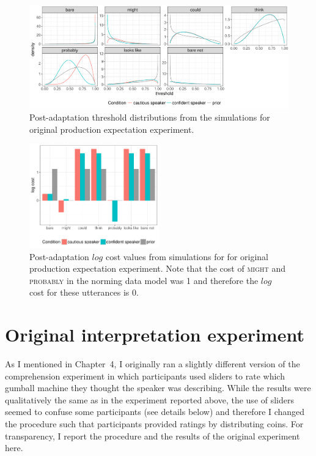 \begin{figure}[h!]
  \includegraphics[width=\textwidth]{plots/fig-F2-adaptation-posterior-thresholds.pdf}
  \caption{Post-adaptation threshold distributions from the simulations for original production expectation experiment. \label{fig:post-exposure-thresholds-original}}
\end{figure}

\begin{figure}[h!]
\center
  \includegraphics[width=0.5\textwidth]{plots/fig-F3-adaptation-posterior-costs.pdf}
  \caption{Post-adaptation $log$ cost values from simulations for for original production expectation experiment. Note that the cost of \textsc{might} and \textsc{probably} 
  in the norming data model was 1 and therefore the $log$ cost for these utterances is 0.  \label{fig:post-exposure-costs-original}}
\end{figure}




\chapter{Original interpretation experiment}

As I mentioned in Chapter~4, I originally ran a slightly different version of the comprehension experiment in which participants used sliders to rate which gumball machine they thought the speaker was describing. While the results were qualitatively the same as in the experiment reported above, the use of sliders seemed to confuse some participants (see details below) and therefore I changed the procedure such that participants provided ratings by distributing coins. For transparency, I report the 
procedure and the results of the original experiment here.

